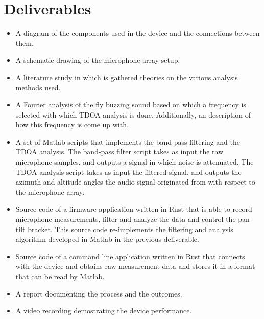 \documentclass[a4paper]{article}
\begin{document}
\section{Deliverables}
\begin{itemize}
    \item A diagram of the components used in the device and the connections between them.
    \item A schematic drawing of the microphone array setup.
    \item A literature study in which is gathered theories on the various analysis methods used.
    \item A Fourier analysis of the fly buzzing sound based on which a frequency is selected with which TDOA analysis is done. Additionally, an description of how this frequency is come up with.
    \item A set of Matlab scripts that implements the band-pass filtering and the TDOA analysis. The band-pass filter script takes as input the raw microphone samples, and outputs a signal in which noise is attenuated. The TDOA analysis script takes as input the filtered signal, and outputs the azimuth and altitude angles the audio signal originated from with respect to the microphone array.
    \item Source code of a firmware application written in Rust that is able to record microphone measurements, filter and analyze the data and control the pan-tilt bracket. This source code re-implements the filtering and analysis algorithm developed in Matlab in the previous deliverable.
    \item Source code of a command line application written in Rust that connects with the device and obtains raw measurement data and stores it in a format that can be read by Matlab.
    \item A report documenting the process and the outcomes.
    \item A video recording demostrating the device performance.
\end{itemize}



\end{document}

